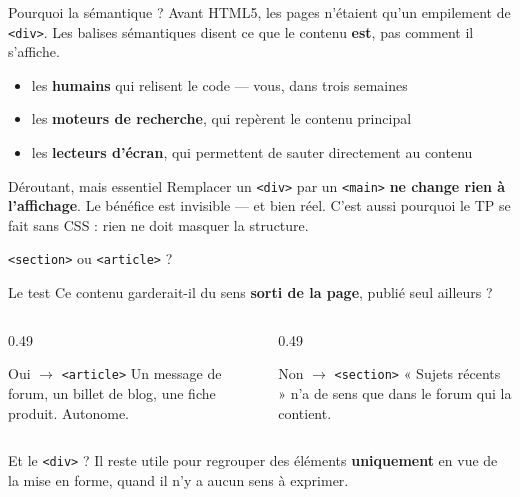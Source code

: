 \documentclass[aspectratio=169,11pt]{beamer}
\begin{document}
\begin{frame}{Pourquoi la sémantique ?}
  Avant HTML5, les pages n'étaient qu'un empilement de \texttt{<div>}. Les balises sémantiques disent ce que le contenu \textbf{est}, pas comment il s'affiche.
  \vspace{0.3cm}
  \begin{itemize}
    \item les \textbf{humains} qui relisent le code --- vous, dans trois semaines
    \item les \textbf{moteurs de recherche}, qui repèrent le contenu principal
    \item les \textbf{lecteurs d'écran}, qui permettent de sauter directement au contenu
  \end{itemize}
  \vspace{0.35cm}
  \begin{alertblock}{Déroutant, mais essentiel}
    Remplacer un \texttt{<div>} par un \texttt{<main>} \textbf{ne change rien à l'affichage}. Le bénéfice est invisible --- et bien réel. C'est aussi pourquoi le TP se fait sans CSS : rien ne doit masquer la structure.
  \end{alertblock}
\end{frame}

\begin{frame}{\texttt{<section>} ou \texttt{<article>} ?}
  \begin{block}{Le test}
    Ce contenu garderait-il du sens \textbf{sorti de la page}, publié seul ailleurs ?
  \end{block}
  \vspace{0.4cm}
  \begin{columns}[T]
    \begin{column}{0.49\textwidth}
      \begin{exampleblock}{Oui $\rightarrow$ \texttt{<article>}}
        Un message de forum, un billet de blog, une fiche produit. Autonome.
      \end{exampleblock}
    \end{column}
    \begin{column}{0.49\textwidth}
      \begin{exampleblock}{Non $\rightarrow$ \texttt{<section>}}
        « Sujets récents » n'a de sens que dans le forum qui la contient.
      \end{exampleblock}
    \end{column}
  \end{columns}
  \vspace{0.4cm}
  \begin{center}
    \small Et le \texttt{<div>} ? Il reste utile pour regrouper des éléments \textbf{uniquement} en vue de la mise en forme, quand il n'y a aucun sens à exprimer.
  \end{center}
\end{frame}
\end{document}

